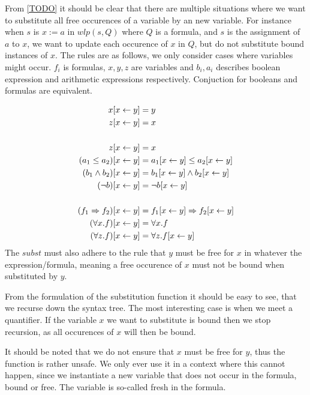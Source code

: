 From \autoref{TODO} it should be clear that there are multiple situations where we want to substitute
all free occurences of a variable by an new variable.
For instance when $s$ is $x := a$ in $wlp(s, Q)$ where $Q$ is a formula, and $s$ is the assignment of $a$ to $x$,
we want to update each occurence of $x$ in $Q$, but do not substitute bound instances of $x$.
The rules are as follows, we only consider cases where variables might occur. $f_{i}$ is formulas, $x,y,z$ are variables and $b_{i}, a_{i}$ describes boolean expression and arithmetic expressions respectively. Conjuction for booleans and formulas are equivalent.

\begin{align*}
x[x \leftarrow y] &= y \\
z[x \leftarrow y] &= x \\
&\\
z[x \leftarrow y] &= x \\
(a_{1} \leq a_{2})[x \leftarrow y] &= a_{1}[x \leftarrow y] \le a_{2}[x \leftarrow y] \\
(b_{1} \wedge b_{2})[x \leftarrow y] &= b_{1}[x \leftarrow y] \wedge b_{2}[x \leftarrow y] \\
(\neg b)[x \leftarrow y] &= \neg b[x \leftarrow y] \\
&\\
(f_{1} \Rightarrow f_{2})[x \leftarrow y] &= f_{1}[x \leftarrow y] \Rightarrow f_{2}[x \leftarrow y] \\
(\forall x. f)[x \leftarrow y] &=  \forall x. f\\
(\forall z. f)[x \leftarrow y] &=  \forall z. f[x \leftarrow y]\\
\end{align*}
The $subst$ must also adhere to the rule that $y$ must be free for $x$ in whatever the expression/formula,
meaning a free occurence of $x$ must not be bound when substituted by $y$.

From the formulation of the substitution function it should be easy to see, that we recurse down the syntax tree.
The most interesting case is when we meet a quantifier. If the variable $x$ we want to substitute is bound then we stop recursion, as all occurences of $x$ will then be bound.

It should be noted that we do not ensure that $x$ must be free for $y$,
thus the function is rather unsafe.
We only ever use it in a context where this cannot happen, since we instantiate a new variable that does not occur in the formula, bound or free. The variable is so-called fresh in the formula.

